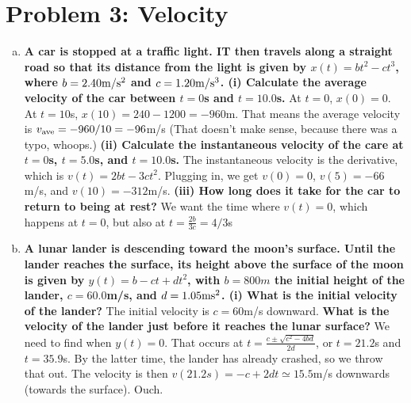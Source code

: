 \documentclass[10pt,letter]{article}
\begin{document}
\section*{Problem 3: Velocity}
\begin{enumerate}[(a)]
\item {\bf A car is stopped at a traffic light. IT then travels along a straight road so that its distance from the light is given by $x(t) = bt^2 - ct^3$, where $b = 2.40 {\rm m}/{\rm s}^2$ and $c = 1.20 {\rm m}/{\rm s}^3$. (i) Calculate the average velocity of the car between $t = 0$s and $t = 10.0$s.}
At $t=0$, $x(0) = 0$. At $t = 10$s, $x(10) = 240 -1200 = -960$m. That means the average velocity is $v_{\rm ave} = -960/10 = -96$m/s (That doesn't make sense, because there was a typo, whoops.)
 {\bf (ii) Calculate the instantaneous velocity of the care at $t = 0$s, $t = 5.0$s, and $t = 10.0$s.} 
 The instantaneous velocity is the derivative, which is $v(t) = 2bt -3ct^2$. Plugging in, we get $v(0) = 0$, $v(5) = -66$m/s, and $v(10) = -312$m/s.
 {\bf (iii) How long does it take for the car to return to being at rest?}
 We want the time where $v(t) = 0$, which happens at $t = 0$, but also at $t = \frac{2b}{3c} = 4/3$s
\item {\bf A lunar lander is descending toward the moon's surface. Until the lander reaches the surface, its height above the surface of the moon is given by $y(t) = b - ct + dt^2$, with $b = 800 m$ the initial height of the lander, $c = 60.0 $m/s, and $d = 1.05 {\rm m}{\rm s}^2$.  (i) What is the initial velocity of the lander?}
The initial velocity is $c = 60$m/s downward.
{\bf  What is the velocity of the lander just before it reaches the lunar surface?}
We need to find when $y(t) = 0$. That occurs at $t = \frac{c \pm \sqrt{c^2 - 4bd}}{2d}$, or $t = 21.2$s and $t = 35.9$s. By the latter time, the lander has already crashed, so we throw that out. The velocity is then $v(21.2s) = -c + 2 d t \simeq15.5$m/s downwards (towards the surface). Ouch.

\end{enumerate}
\end{document}
